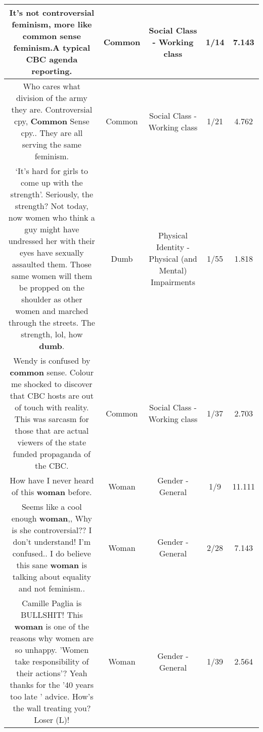 \documentclass[11pt]{article}
\newlength\mylength
\begin{document}
\begin{center}
\begin{longtable}{|C{.65\mylength}|C{.30\mylength}|C{.12\mylength}|C{.12\mylength}|C{.12\mylength}|}
  \small It's not controversial feminism, more like \textbf{common} sense feminism.A typical CBC agenda reporting.\normalsize   & Common & Social Class - Working class & 1/14 & 7.143 \\  \hline
  \small Who cares what division of the army they are. Controversial cpy, \textbf{Common} Sense cpy.. They are all serving the same feminism.\normalsize   & Common & Social Class - Working class & 1/21 & 4.762 \\  \hline
  \small ‘It's hard for girls to come up with the strength'.  Seriously, the strength?  Not today, now women who think a guy might have undressed her with their eyes have sexually assaulted them.  Those same women will them be propped on the shoulder as other women and marched through the streets.  The strength, lol, how \textbf{dumb}.\normalsize   & Dumb & Physical Identity - Physical (and Mental) Impairments & 1/55 & 1.818 \\  \hline
  \small Wendy is confused by \textbf{common} sense. Colour me shocked to discover that CBC hosts are out of touch with reality. This was sarcasm for those that are actual viewers of the state funded propaganda of the CBC.\normalsize   & Common & Social Class - Working class & 1/37 & 2.703 \\  \hline
  \small How have I never heard of this \textbf{woman} before.\normalsize   & Woman & Gender - General & 1/9 & 11.111 \\  \hline
  \small Seems like a cool enough \textbf{woman},, Why is she controversial?? I don't understand! I'm confused.. I do believe this sane \textbf{woman} is talking about equality and not feminism..\normalsize   & Woman & Gender - General & 2/28 & 7.143 \\  \hline
  \small Camille Paglia is BULLSHIT! This \textbf{woman} is one of the reasons why women are so unhappy. 'Women take responsibility of their actions'? Yeah thanks for the '40 years too late ' advice. How's the wall treating you? Loser (L)!\normalsize   & Woman & Gender - General & 1/39 & 2.564 \\  \hline

\end{longtable}
\end{center}
\end{document}
